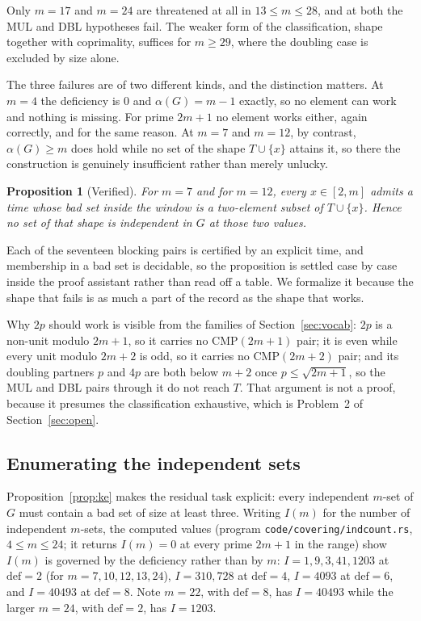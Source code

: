 \documentclass[11pt]{amsart}
\theoremstyle{plain}
\newtheorem{proposition}[theorem]{Proposition}
\theoremstyle{definition}
\begin{document}
Only $m = 17$ and $m = 24$ are threatened at all in $13 \le m \le 28$, and at both the MUL and DBL
hypotheses fail. The weaker form of the classification, shape together with coprimality, suffices
for $m \ge 29$, where the doubling case is excluded by size alone.

The three failures are of two different kinds, and the distinction matters. At $m = 4$ the
deficiency is $0$ and $\alpha(G) = m-1$ exactly, so no element can work and nothing is missing. For
prime $2m+1$ no element works either, again correctly, and for the same reason. At $m = 7$ and
$m = 12$, by contrast, $\alpha(G) \ge m$ does hold while no set of the shape $T \cup \{x\}$ attains
it, so there the construction is genuinely insufficient rather than merely unlucky.

\begin{proposition}[Verified]\label{prop:topgap-fails}
For $m = 7$ and for $m = 12$, every $x \in [2,m]$ admits a time whose bad set inside the window is a
two-element subset of $T \cup \{x\}$. Hence no set of that shape is independent in $G$ at those two
values.
\end{proposition}

Each of the seventeen blocking pairs is certified by an explicit time, and membership in a bad set
is decidable, so the proposition is settled case by case inside the proof assistant rather than read
off a table. We formalize it because the shape that fails is as much a part of the record as the
shape that works.

Why $2p$ should work is visible from the families of Section~\ref{sec:vocab}: $2p$ is a non-unit
modulo $2m+1$, so it carries no CMP$(2m+1)$ pair; it is even while every unit modulo $2m+2$ is odd,
so it carries no CMP$(2m+2)$ pair; and its doubling partners $p$ and $4p$ are both below $m+2$ once
$p \le \sqrt{2m+1}$, so the MUL and DBL pairs through it do not reach $T$. That argument is not a
proof, because it presumes the classification exhaustive, which is Problem~2 of
Section~\ref{sec:open}.

\subsection*{Enumerating the independent sets}
Proposition~\ref{prop:ke} makes the residual task explicit: every independent $m$-set of $G$ must
contain a bad set of size at least three. Writing $I(m)$ for the number of independent $m$-sets, the
computed values (program \texttt{code/covering/indcount.rs}, $4\le m\le24$; it returns $I(m)=0$ at every prime $2m+1$ in the range) show $I(m)$ is governed by the deficiency rather than by $m$:
$I = 1, 9, 3, 41, 1203$ at $\mathrm{def} = 2$ (for $m = 7,10,12,13,24$), $I = 310, 728$ at
$\mathrm{def} = 4$, $I = 4093$ at $\mathrm{def} = 6$, and $I = 40493$ at $\mathrm{def} = 8$. Note
$m = 22$, with $\mathrm{def} = 8$, has $I = 40493$ while the larger $m = 24$, with
$\mathrm{def} = 2$, has $I = 1203$.
\end{document}
